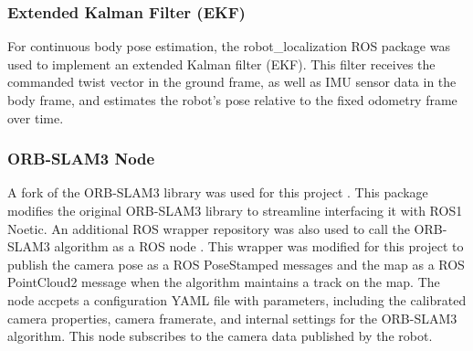\subsubsection{ Extended Kalman Filter (EKF)}

For continuous body pose estimation, the robot\_localization ROS package \cite{robotlocalization} was used to implement an extended Kalman filter (EKF). This filter receives the commanded twist vector in the ground frame, as well as IMU sensor data in the body frame, and estimates the robot's pose relative to the fixed odometry frame over time.

\subsubsection{ ORB-SLAM3 Node}

A fork of the ORB-SLAM3 library was used for this project \cite{orb_slam_ros}. This package modifies the original ORB-SLAM3 library to streamline interfacing it with ROS1 Noetic. An additional ROS wrapper repository was also used to call the ORB-SLAM3 algorithm as a ROS node \cite{orb_slam_ros_wrapper}. This wrapper was modified for this project to publish the camera pose as a ROS PoseStamped messages \cite{posestamped} and the map as a ROS PointCloud2 message \cite{pointcloud2} when the algorithm maintains a track on the map. The node accpets a configuration YAML file with parameters, including the calibrated camera properties, camera framerate, and internal settings for the ORB-SLAM3 algorithm. This node subscribes to the camera data published by the robot.
